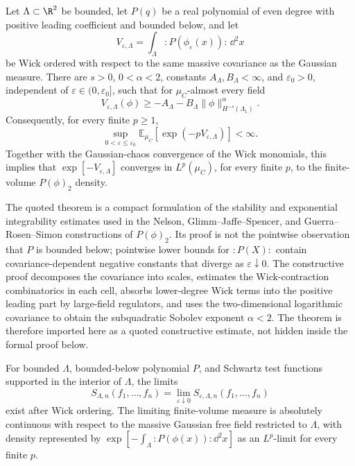 \begin{quotedtheorem}
\label{qthm:p-phi-two-stability}
Let \(\Lambda\subset\R^2\) be bounded, let \(P(q)\) be a real polynomial of
even degree with positive leading coefficient and bounded below, and let
\[
  V_{\varepsilon,\Lambda}
  =
  \int_\Lambda :\!P(\phi_\varepsilon(x))\!:\,\dd^2x
\]
be Wick ordered with respect to the same massive covariance as the Gaussian
measure.  There are \(s>0\), \(0<\alpha<2\), constants
\(A_\Lambda,B_\Lambda<\infty\), and \(\varepsilon_0>0\), independent of
\(\varepsilon\in(0,\varepsilon_0]\), such that for \(\mu_C\)-almost every
field
\begin{equation}
  V_{\varepsilon,\Lambda}(\phi)
  \geq
  -A_\Lambda-B_\Lambda\|\phi\|_{H^{-s}(\Lambda_1)}^{\alpha}.
  \label{eq:p-phi-two-stability-estimate}
\end{equation}
Consequently, for every finite \(p\geq1\),
\begin{equation}
  \sup_{0<\varepsilon\leq\varepsilon_0}
  \mathbb E_{\mu_C}\!\left[
    \exp(-pV_{\varepsilon,\Lambda})
  \right]<\infty .
  \label{eq:p-phi-two-uniform-exp-integrability}
\end{equation}
Together with the Gaussian-chaos convergence of the Wick monomials, this
implies that \(\exp[-V_{\varepsilon,\Lambda}]\) converges in \(L^p(\mu_C)\),
for every finite \(p\), to the finite-volume \(P(\phi)_2\) density.
\end{quotedtheorem}

The quoted theorem is a compact formulation of the stability and exponential
integrability estimates used in the Nelson, Glimm--Jaffe--Spencer, and
Guerra--Rosen--Simon constructions of \(P(\phi)_2\).  Its proof is not the
pointwise observation that \(P\) is bounded below; pointwise lower bounds for
\(:\!P(X)\!:\) contain covariance-dependent negative constants that diverge
as \(\varepsilon\downarrow0\).  The constructive proof decomposes the
covariance into scales, estimates the Wick-contraction combinatorics in each
cell, absorbs lower-degree Wick terms into the positive leading part by
large-field regulators, and uses the two-dimensional logarithmic covariance
to obtain the subquadratic Sobolev exponent \(\alpha<2\).  The theorem is
therefore imported here as a quoted constructive estimate, not hidden inside
the formal proof below.

\begin{theorem}
\label{thm:p-phi-two-finite-volume-uv-limit}
For bounded \(\Lambda\), bounded-below polynomial \(P\), and Schwartz test
functions supported in the interior of \(\Lambda\), the limits
\[
  S_{\Lambda,n}(f_1,\ldots,f_n)
  =
  \lim_{\varepsilon\downarrow0}
  S_{\varepsilon,\Lambda,n}(f_1,\ldots,f_n)
\]
exist after Wick ordering.  The limiting finite-volume measure is absolutely
continuous with respect to the massive Gaussian free field restricted to
\(\Lambda\), with density represented by
\(\exp[-\int_\Lambda :\!P(\phi(x))\!:\dd^2x]\) as an \(L^p\)-limit for every
finite \(p\).
\end{theorem}

